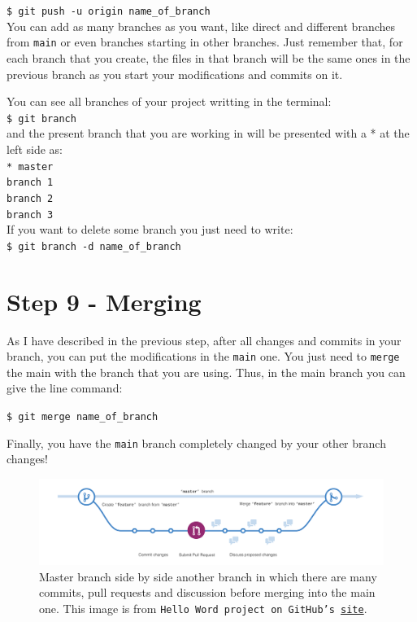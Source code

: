 \documentclass[12pt,a4paper,titlepage,brazil]{article}
\begin{document}
{\texttt{\$ git push -u origin name\_of\_branch}\\

You can add as many branches as you want, like direct and different branches from \texttt{main} or even branches starting in other branches. Just remember that, for each branch that you create, the files in that branch will be the same ones in the previous branch as you start your modifications and commits on it.

You can see all branches of your project writting in the terminal:\\

\texttt{\$ git branch}\\

and the present branch that you are working in will be presented with a * at the left side as:\\

\texttt{* master}\\

\texttt{branch 1}\\

\texttt{branch 2}\\

\texttt{branch 3}\\

If you want to delete some branch you just need to write:\\

\texttt{\$ git branch -d name\_of\_branch}\\


\section{Step 9 - Merging}

As I have described in the previous step, after all changes and commits in your branch, you can put the modifications in the \texttt{main} one. You just need to \texttt{merge} the main with the branch that you are using. Thus, in the main branch you can give the line command:

\texttt{\$ git merge name\_of\_branch}

Finally, you have the \texttt{main} branch completely changed by your other branch changes!

\begin{figure}[h!]
 \centering 
 \includegraphics[scale=0.24]{branching.png}
 \caption{Master branch side by side another branch in which there are many commits, pull requests and discussion before merging into the main one. This image is from \texttt{Hello Word project on GitHub's \href{https://guides.github.com/activities/hello-world/branching.png}{site}}.}
\end{figure}

}
\end{document}
